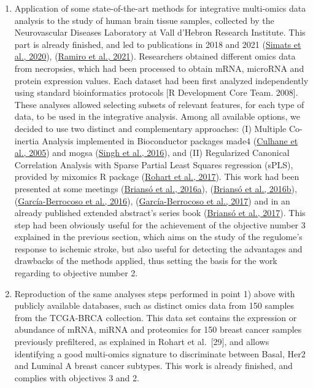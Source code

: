\documentclass[a4paper, nobind]{templates/ociamthesis}
\begin{document}
\begin{enumerate}
\def\labelenumi{\arabic{enumi}.}
\item
  Application of some state-of-the-art methods for integrative multi-omics data analysis to the study of human brain tissue samples, collected by the Neurovascular Diseases Laboratory at Vall d'Hebron Research Institute. This part is already finished, and led to publications in 2018 and 2021 (\protect\hyperlink{ref-simats_mouse_2020}{Simats et al., 2020}), (\protect\hyperlink{ref-ramiro_integrative_2021}{Ramiro et al., 2021}). Researchers obtained different omics data from necropsies, which had been processed to obtain mRNA, microRNA and protein expression values. Each dataset had been first analyzed independently using standard bioinformatics protocols {[}R Development Core Team. 2008{]}. These analyses allowed selecting subsets of relevant features, for each type of data, to be used in the integrative analysis. Among all available options, we decided to use two distinct and complementary approaches: (I) Multiple Co-inertia Analysis implemented in Bioconductor packages made4 (\protect\hyperlink{ref-culhane_made4_2005}{Culhane et al., 2005}) and mogsa (\protect\hyperlink{ref-singh_diablo_2016}{Singh et al., 2016}), and (II) Regularized Canonical Correlation Analysis with Sparse Partial Least Squares regression (sPLS), provided by mixomics R package (\protect\hyperlink{ref-rohart_mixomics_2017}{Rohart et al., 2017}). This work had been presented at some meetings (\protect\hyperlink{ref-brianso_ibc_2016}{Briansó et al., 2016a}), (\protect\hyperlink{ref-brianso_eccb_2016}{Briansó et al., 2016b}), (\protect\hyperlink{ref-garcia-berrocoso_scb_2016}{García-Berrocoso et al., 2016}), (\protect\hyperlink{ref-garcia-berrocoso_scbf_2017}{García-Berrocoso et al., 2017}) and in an already published extended abstract's series book (\protect\hyperlink{ref-brianso_integrative_2017}{Briansó et al., 2017}). This step had been obviously useful for the achievement of the objective number 3 explained in the previous section, which aims on the study of the regulome's response to ischemic stroke, but also useful for detecting the advantages and drawbacks of the methods applied, thus setting the basis for the work regarding to objective number 2.
\item
  Reproduction of the same analyses steps performed in point 1) above with publicly available databases, such as distinct omics data from 150 samples from the TCGA-BRCA collection. This data set contains the expression or abundance of mRNA, miRNA and proteomics for 150 breast cancer samples previously prefiltered, as explained in Rohart et al.~{[}29{]}, and allows identifying a good multi-omics signature to discriminate between Basal, Her2 and Luminal A breast cancer subtypes. This work is already finished, and complies with objectives 3 and 2.

\end{enumerate}
\end{document}
